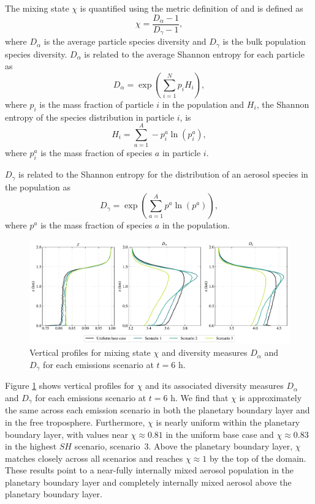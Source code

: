 The mixing state $\chi$ is quantified using the metric definition of \textcite{riemer_quantifying_2013} and is defined as 
\begin{equation}
\chi = \frac{D_{\alpha}-1}{D_{\gamma}-1},
\end{equation}
where $D_{\alpha}$ is the average particle species diversity and $D_{\gamma}$ is the bulk population species diversity. $D_{\alpha}$ is related to the average Shannon entropy for each particle as 
 \begin{equation}
D_{\alpha} = \exp\left(\sum_{i=1}^N p_i H_i\right),
\end{equation}
where $p_i$ is the mass fraction of particle $i$ in the population and $H_i$, the Shannon entropy of the species distribution in particle $i$, is 
\begin{equation}
H_i = \sum_{a=1}^A -p_i^a\ln(p_i^a),
\end{equation}
where $p_i^a$ is the mass fraction of species $a$ in particle $i$.

$D_{\gamma}$ is related to the Shannon entropy for the distribution of an aerosol species in the population as 
 \begin{equation}
D_{\gamma} = \exp\left(\sum_{a=1}^A p^a \ln(p^a)\right),
\end{equation}
where $p^a$ is the mass fraction of species $a$ in the population.

\begin{figure}[!t]
  \centering
    \includegraphics[width=\textwidth]{figures/chapter5/aerosol-mixingstate-vertical-profiles-time36.pdf}
    \caption{Vertical profiles for mixing state $\chi$ and diversity measures $D_{\alpha}$ and $D_{\gamma}$ for each emissions scenario at $t=6$ h.}
    \label{fig:mixing-state-vert-profiles}
\end{figure}

Figure \ref{fig:mixing-state-vert-profiles} shows vertical profiles for $\chi$ and its associated diversity measures $D_{\alpha}$ and $D_{\gamma}$ for each emissions scenario at $t=6$ h. We find that $\chi$ is approximately the same across each emission scenario in both the planetary boundary layer and in the free troposphere. Furthermore, $\chi$ is nearly uniform within the planetary boundary layer, with values near $\chi\approx0.81$ in the uniform base case and $\chi\approx0.83$ in the highest $SH$ scenario, scenario~3. Above the planetary boundary layer, $\chi$ matches closely across all scenarios and reaches $\chi\approx1$ by the top of the domain. These results point to a near-fully internally mixed aerosol population in the planetary boundary layer and completely internally mixed aerosol above the planetary boundary layer. 

